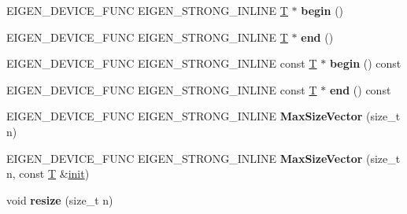 \begin{DoxyCompactItemize}
E\+I\+G\+E\+N\+\_\+\+D\+E\+V\+I\+C\+E\+\_\+\+F\+U\+NC E\+I\+G\+E\+N\+\_\+\+S\+T\+R\+O\+N\+G\+\_\+\+I\+N\+L\+I\+NE \hyperlink{group___sparse_core___module}{T} $\ast$ {\bfseries begin} ()
\item 
\mbox{\label{class_eigen_1_1_max_size_vector_aebb12f1c135e40ff95e32f48d6101dc2}} 
E\+I\+G\+E\+N\+\_\+\+D\+E\+V\+I\+C\+E\+\_\+\+F\+U\+NC E\+I\+G\+E\+N\+\_\+\+S\+T\+R\+O\+N\+G\+\_\+\+I\+N\+L\+I\+NE \hyperlink{group___sparse_core___module}{T} $\ast$ {\bfseries end} ()
\item 
\mbox{\label{class_eigen_1_1_max_size_vector_a13cce661fb4944b99472f5b0043f04d9}} 
E\+I\+G\+E\+N\+\_\+\+D\+E\+V\+I\+C\+E\+\_\+\+F\+U\+NC E\+I\+G\+E\+N\+\_\+\+S\+T\+R\+O\+N\+G\+\_\+\+I\+N\+L\+I\+NE const \hyperlink{group___sparse_core___module}{T} $\ast$ {\bfseries begin} () const
\item 
\mbox{\label{class_eigen_1_1_max_size_vector_a257f3df4998e80a057b18daf5e1b5fc9}} 
E\+I\+G\+E\+N\+\_\+\+D\+E\+V\+I\+C\+E\+\_\+\+F\+U\+NC E\+I\+G\+E\+N\+\_\+\+S\+T\+R\+O\+N\+G\+\_\+\+I\+N\+L\+I\+NE const \hyperlink{group___sparse_core___module}{T} $\ast$ {\bfseries end} () const
\item 
\mbox{\label{class_eigen_1_1_max_size_vector_a6a13cfcfe299b9ab443c0c483de82dbb}} 
E\+I\+G\+E\+N\+\_\+\+D\+E\+V\+I\+C\+E\+\_\+\+F\+U\+NC E\+I\+G\+E\+N\+\_\+\+S\+T\+R\+O\+N\+G\+\_\+\+I\+N\+L\+I\+NE {\bfseries Max\+Size\+Vector} (size\+\_\+t n)
\item 
\mbox{\label{class_eigen_1_1_max_size_vector_a917e97a3c9326232702b0f8fc7c4c2d3}} 
E\+I\+G\+E\+N\+\_\+\+D\+E\+V\+I\+C\+E\+\_\+\+F\+U\+NC E\+I\+G\+E\+N\+\_\+\+S\+T\+R\+O\+N\+G\+\_\+\+I\+N\+L\+I\+NE {\bfseries Max\+Size\+Vector} (size\+\_\+t n, const \hyperlink{group___sparse_core___module}{T} \&\hyperlink{structinit}{init})
\item 
\mbox{\label{class_eigen_1_1_max_size_vector_aa438323b34ae0f12ae27db22d70891d8}} 
void {\bfseries resize} (size\+\_\+t n)
\item 
\mbox{\label{class_eigen_1_1_max_size_vector_a8e7af55e22c320493f08e371813c8cea}} 

\end{DoxyCompactItemize}
